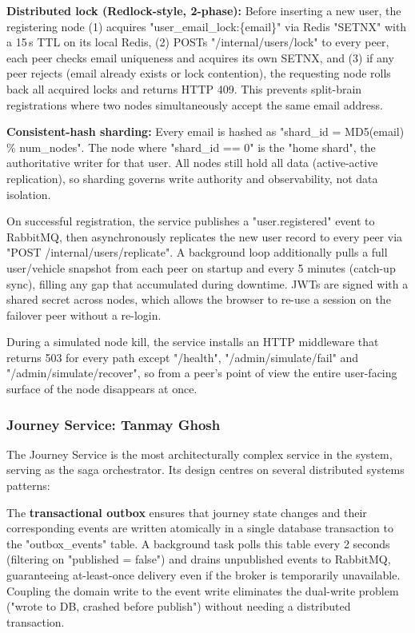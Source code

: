 \documentclass[11pt,a4paper]{article}
\begin{document}
\textbf{Distributed lock (Redlock-style, 2-phase):} Before inserting a new user, the registering node (1) acquires "user\_email\_lock:\{email\}" via Redis "SETNX" with a 15\,s TTL on its local Redis, (2) POSTs "/internal/users/lock" to every peer, each peer checks email uniqueness and acquires its own SETNX, and (3) if any peer rejects (email already exists or lock contention), the requesting node rolls back all acquired locks and returns HTTP 409. This prevents split-brain registrations where two nodes simultaneously accept the same email address.

\textbf{Consistent-hash sharding:} Every email is hashed as "shard\_id = MD5(email) \% num\_nodes". The node where "shard\_id == 0" is the "home shard", the authoritative writer for that user. All nodes still hold all data (active-active replication), so sharding governs write authority and observability, not data isolation.

On successful registration, the service publishes a "user.registered" event to RabbitMQ, then asynchronously replicates the new user record to every peer via "POST /internal/users/replicate". A background loop additionally pulls a full user/vehicle snapshot from each peer on startup and every 5 minutes (catch-up sync), filling any gap that accumulated during downtime. JWTs are signed with a shared secret across nodes, which allows the browser to re-use a session on the failover peer without a re-login.

During a simulated node kill, the service installs an HTTP middleware that returns 503 for every path except "/health", "/admin/simulate/fail" and "/admin/simulate/recover", so from a peer's point of view the entire user-facing surface of the node disappears at once.
 
\subsubsection{Journey Service: Tanmay Ghosh}
 
The Journey Service is the most architecturally complex service in the system, serving as the saga orchestrator. Its design centres on several distributed systems patterns:
 
The \textbf{transactional outbox} ensures that journey state changes and their corresponding events are written atomically in a single database transaction to the "outbox\_events" table. A background task polls this table every 2 seconds (filtering on "published = false") and drains unpublished events to RabbitMQ, guaranteeing at-least-once delivery even if the broker is temporarily unavailable. Coupling the domain write to the event write eliminates the dual-write problem ("wrote to DB, crashed before publish") without needing a distributed transaction.
 
\end{document}

